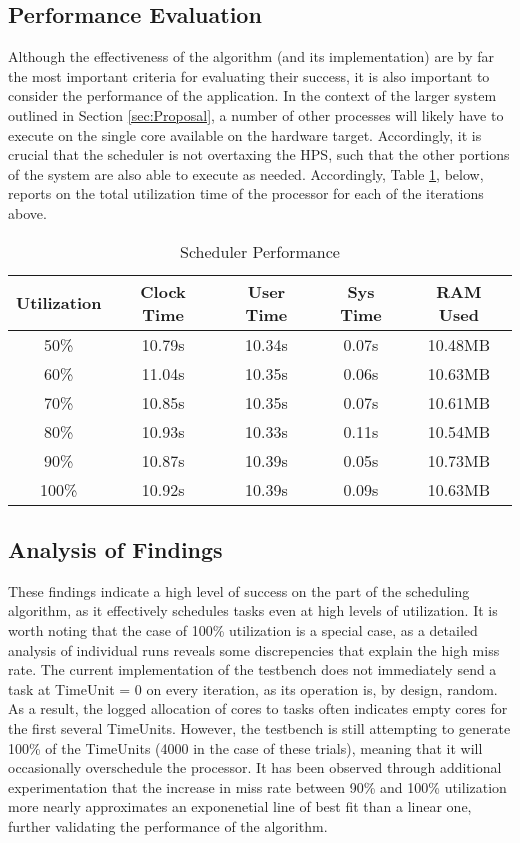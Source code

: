 \subsection{Performance Evaluation}\label{subsec:performanceData}
Although the effectiveness of the algorithm (and its implementation) are by far the most important criteria for evaluating their success, it is also important to consider the performance of the application. In the context of the larger system outlined in Section \ref{sec:Proposal}, a number of other processes will likely have to execute on the single core available on the hardware target. Accordingly, it is crucial that the scheduler is not overtaxing the HPS, such that the other portions of the system are also able to execute as needed. Accordingly, Table \ref{table:SchedPerf}, below, reports on the total utilization time of the processor for each of the iterations above.

\begin{table}[h!]
    \centering\begin{tabular}{| c | c | c | c | c |}
        \hline
        Utilization & Clock Time & User Time & Sys Time & RAM Used \\
        \hline
        50\% & 10.79s & 10.34s & 0.07s & 10.48MB \\
        60\% & 11.04s & 10.35s & 0.06s & 10.63MB \\
        70\% & 10.85s & 10.35s & 0.07s & 10.61MB \\
        80\% & 10.93s & 10.33s & 0.11s & 10.54MB \\
        90\% & 10.87s & 10.39s & 0.05s & 10.73MB \\
        100\% & 10.92s & 10.39s & 0.09s & 10.63MB \\
        \hline
    \end{tabular}
    \caption{Scheduler Performance}
    \label{table:SchedPerf}
\end{table}

\subsection{Analysis of Findings}\label{subsec:findingsAnalysis}
These findings indicate a high level of success on the part of the scheduling algorithm, as it effectively schedules tasks even at high levels of utilization. It is worth noting that the case of 100\% utilization is a special case, as a detailed analysis of individual runs reveals some discrepencies that explain the high miss rate. The current implementation of the testbench does not immediately send a task at TimeUnit = 0 on every iteration, as its operation is, by design, random. As a result, the logged allocation of cores to tasks often indicates empty cores for the first several TimeUnits. However, the testbench is still attempting to generate 100\% of the TimeUnits (4000 in the case of these trials), meaning that it will occasionally overschedule the processor. It has been observed through additional experimentation that the increase in miss rate between 90\% and 100\% utilization more nearly approximates an exponenetial line of best fit than a linear one, further validating the performance of the algorithm.

